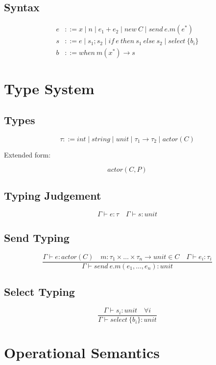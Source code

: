 \documentclass[11pt]{article}
\begin{document}
\subsection{Syntax}

\begin{align*}
e &::= x \mid n \mid e_1 + e_2 \mid new\ C \mid send\ e.m(e^*) \\
s &::= e \mid s_1 ; s_2 \mid if\ e\ then\ s_1\ else\ s_2 \mid select\ \{b_i\} \\
b &::= when\ m(x^*) \rightarrow s
\end{align*}

\section{Type System}

\subsection{Types}

\[
\tau ::= int \mid string \mid unit \mid \tau_1 \to \tau_2 \mid actor(C)
\]

Extended form:

\[
actor(C, P)
\]

\subsection{Typing Judgement}

\[
\Gamma \vdash e : \tau
\quad
\Gamma \vdash s : unit
\]

\subsection{Send Typing}

\[
\frac{
\Gamma \vdash e : actor(C)
\quad
m : \tau_1 \times \dots \times \tau_n \to unit \in C
\quad
\Gamma \vdash e_i : \tau_i
}{
\Gamma \vdash send\ e.m(e_1,\dots,e_n) : unit
}
\]

\subsection{Select Typing}

\[
\frac{
\Gamma \vdash s_i : unit \quad \forall i
}{
\Gamma \vdash select\ \{b_i\} : unit
}
\]

\section{Operational Semantics}
\end{document}
